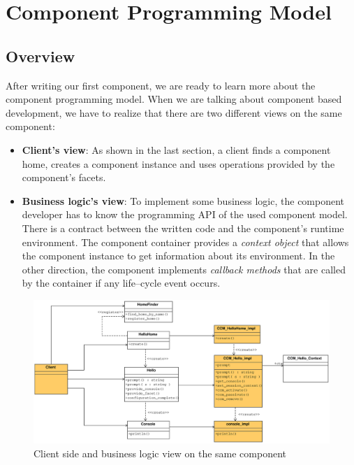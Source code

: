 
\chapter{Component Programming Model}

\section{Overview}

After writing our first component, we are ready to learn more about the 
component programming model.
When we are talking about component based development, we have to realize that there 
are two different views on the same component:
\begin{itemize}
\item {\bf Client's view}: As shown in the last section, a client finds a component 
home, creates a component instance and uses operations provided by the component's facets.

\item {\bf Business logic's view}: To implement some business logic, the component
developer has to know the programming API of the used component model.
There is a contract between the written code and the component's runtime environment.
The component container provides a {\it context object} that allows the component
instance to get information about its environment. In the other direction, the
component implements {\it callback methods} that are called by the container if any
life--cycle event occurs.
\end{itemize}

\begin{figure}[htbp]
    \begin{center}
        \includegraphics [width=12cm,angle=0] {ComponentViews.eps}
        \caption{Client side and business logic view on the same component}
        \label{fig:ComponentViews}
    \end{center}
\end{figure}


